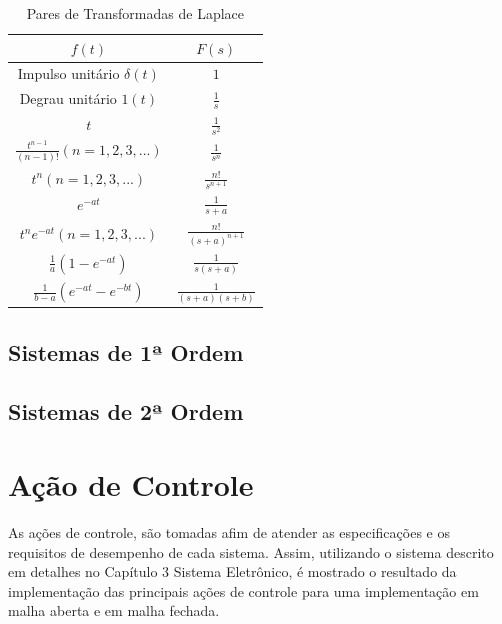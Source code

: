 \begin{table}[h]
\centering
\caption{Pares de Transformadas de Laplace}
\label{tab:Laplace}
\begin{tabular}{c|c}
\hline
$f(t)$ & $F(s)$ \\
\hline
\hline
Impulso unitário $\delta(t)$ 		& $1$ 			\\ \hline
Degrau unitário $1(t)$ 			& $\frac{1}{s}$		\\ \hline
$t$ 					& $\frac{1}{s^2}$ 	\\ \hline
$\frac{t^{n-1}}{(n-1)!} (n=1,2,3,...)$ 	& $\frac{1}{s^n}$ 	\\ \hline
$t^n (n=1,2,3,...)$ 			& $\frac{n!}{s^{n+1}}$ 	\\ \hline
$e^{-at}$ 				& $\frac{1}{s+a}$ 	\\ \hline
$t^n e^{-at} (n=1,2,3,...)$ 		& $\frac{n!}{(s+a)^{n+1}}$ \\\hline
$\frac{1}{a} (1-e^{-at})$ 		& $\frac{1}{s(s+a)}$ 	\\ \hline
$\frac{1}{b-a}(e^{-at}-e^{-bt})$ 	& $\frac{1}{(s+a)(s+b)}$ \\ \hline
\end{tabular}
\end{table}



\subsection{Sistemas de 1ª Ordem}



\subsection{Sistemas de 2ª Ordem}



\section{Ação de Controle}

As ações de controle, são tomadas afim de atender as especificações e os requisitos de desempenho de cada sistema. Assim, utilizando o sistema descrito em detalhes no Capítulo 3 Sistema Eletrônico, é mostrado o resultado da implementação das principais ações de controle para uma implementação em malha aberta e em malha fechada.

